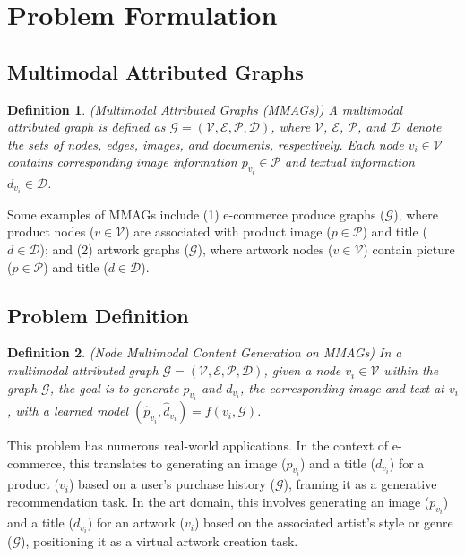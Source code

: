 \section{Problem Formulation}\label{sec:problem-formulation}

\subsection{Multimodal Attributed Graphs}
\newtheorem{definition}{Definition}
\begin{definition}{(Multimodal Attributed Graphs (MMAGs))}
A multimodal attributed graph is defined as $\mathcal{G}=(\mathcal{V}, \mathcal{E}, \mathcal{P}, \mathcal{D})$, where $\mathcal{V}$, $\mathcal{E}$, $\mathcal{P}$, and $\mathcal{D}$ denote the sets of nodes, edges, images, and documents, respectively. Each node $v_i\in \mathcal{V}$ contains corresponding image information $p_{v_i}\in\mathcal{P}$ and textual information $d_{v_i}\in \mathcal{D}$.
\end{definition}
Some examples of MMAGs include (1) e-commerce produce graphs ($\mathcal{G}$), where product nodes ($v\in\mathcal{V}$) are associated with product image ($p \in \mathcal{P}$) and title ($d \in \mathcal{D}$); and (2) artwork graphs ($\mathcal{G}$), where artwork nodes ($v\in\mathcal{V}$) contain picture ($p \in \mathcal{P}$) and title ($d \in \mathcal{D}$).

\subsection{Problem Definition}\label{sec:prob-def}

\begin{definition}{(Node Multimodal Content Generation on MMAGs)}
In a multimodal attributed graph $\mathcal{G}=(\mathcal{V}, \mathcal{E}, \mathcal{P}, \mathcal{D})$, given a node $v_i\in\mathcal{V}$ within the graph $\mathcal{G}$, the goal is to generate $p_{v_i}$ and $d_{v_i}$, the corresponding image and text at $v_i$, with a learned model $(\hat{p}_{v_i}, \hat{d}_{v_i}) = f(v_i, \mathcal{G})$.
\end{definition}
This problem has numerous real-world applications.
In the context of e-commerce, this translates to generating an image ($p_{v_i}$) and a title ($d_{v_i}$) for a product ($v_i$) based on a user’s purchase history ($\mathcal{G}$), framing it as a generative recommendation task.
In the art domain, this involves generating an image ($p_{v_i}$) and a title ($d_{v_i}$) for an artwork ($v_i$) based on the associated artist's style or genre ($\mathcal{G}$), positioning it as a virtual artwork creation task.
